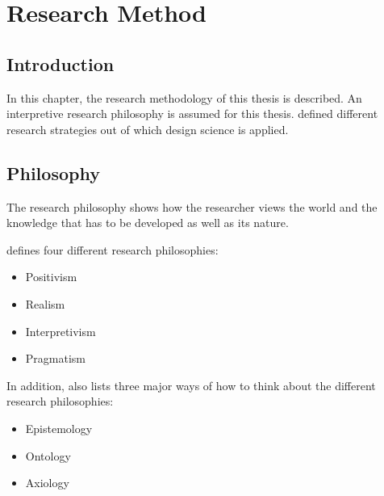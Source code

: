 
\chapter{Research Method} %

\label{Research Method} %


\section{Introduction}

In this chapter, the research methodology of this thesis is described. An interpretive research philosophy is assumed for this thesis. \cite{Hevner2010} defined different research strategies out of which design science is applied.



\section{Philosophy}

The research philosophy shows how the researcher views the world and the knowledge that has to be developed as well as its nature.

\cite{Saunders2009} defines four different research philosophies:
\begin{itemize}[noitemsep,nolistsep]
	\item Positivism
	\item Realism
	\item Interpretivism
	\item Pragmatism
\end{itemize}

In addition, \cite{Saunders2009} also lists three major ways of how to think about the different research philosophies:
\begin{itemize}[noitemsep,nolistsep]
	\item Epistemology
	\item Ontology
	\item Axiology
\end{itemize}





